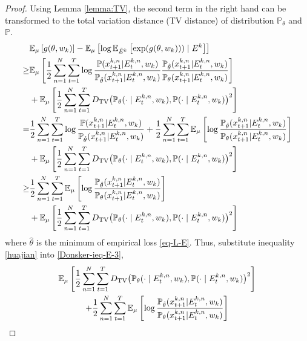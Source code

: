\begin{proof}
	Using Lemma \ref{lemma:TV}, the second term in the right hand can be transformed to the total variation distance (TV distance) of distribution $\mathbb{P}_\theta$ and $\mathbb{P}$.
	\begin{align}
		&\mathbb{E}_{\mu}\left[g(\theta,w_k)\right]-\mathbb{E}_{\mu}\left[\log \mathbb{E}_{\tilde{E}^k}\left[\exp(g(\theta,w_k)))\mid E^k\right]\right] \nonumber\\
		\geq&\mathbb{E}_{\mu}\left[\frac{1}{2}\sum_{n=1}^{N}\sum_{t=1}^T\operatorname{log}\frac{\mathbb{P}(x^{k,n}_{t+1}|E^{k,n}_t,w_k)}{\mathbb{P}_{\hat{\theta}}(x^{k,n}_{t+1}|E^{k,n}_t,w_k)}\frac{\mathbb{P}_{\hat{\theta}}(x^{k,n}_{t+1}|E^{k,n}_t,w_k)}{\mathbb{P}_\theta(x^{k,n}_{t+1}|E^{k,n}_t,w_k)}\right]\\
		&+\mathbb{E}_{\mu}\left[\frac{1}{2}\sum_{n=1}^{N}\sum_{t=1}^TD_{\mathrm{TV}}\big(\mathbb{P}_{\theta}(\cdot\mid E^{k,n}_t,w_k),\mathbb{P}(\cdot\mid E^{k,n}_t,w_k)\big)^2\right] \nonumber\\
		=&\frac{1}{2}\sum_{n=1}^{N}\sum_{t=1}^T\operatorname{log}\frac{\mathbb{P}(x^{k,n}_{t+1}|E^{k,n}_t,w_k)}{\mathbb{P}_{\hat{\theta}}(x^{k,n}_{t+1}|E^{k,n}_t,w_k)}+\frac{1}{2}\sum_{n=1}^{N}\sum_{t=1}^T\mathbb{E}_{\mu}\left[\operatorname{log}\frac{\mathbb{P}_{\hat{\theta}}(x^{k,n}_{t+1}|E^{k,n}_t,w_k)}{\mathbb{P}_\theta(x^{k,n}_{t+1}|E^{k,n}_t,w_k)}\right]\nonumber\\
		&+\mathbb{E}_{\mu}\left[\frac{1}{2}\sum_{n=1}^{N}\sum_{t=1}^TD_{\mathrm{TV}}\big(\mathbb{P}_{\theta}(\cdot\mid E^{k,n}_t,w_k),\mathbb{P}(\cdot\mid E^{k,n}_t,w_k)\big)^2\right] \nonumber\\
		\geq& \frac{1}{2}\sum_{n=1}^{N}\sum_{t=1}^T\mathbb{E}_{\mu}\left[\operatorname{log}\frac{\mathbb{P}_{\hat{\theta}}(x^{k,n}_{t+1}|E^{k,n}_t,w_k)}{\mathbb{P}_{{\theta}}(x^{k,n}_{t+1}|E^{k,n}_t,w_k)}\right]\nonumber\\
		&+\mathbb{E}_{\mu}\left[\frac{1}{2}\sum_{n=1}^{N}\sum_{t=1}^TD_{\mathrm{TV}}\big(\mathbb{P}_{\theta}(\cdot\mid E^{k,n}_t,w_k),\mathbb{P}(\cdot\mid E^{k,n}_t,w_k)\big)^2\right] \label{huajian}
	\end{align}
	where $\hat{\theta}$ is the minimum of empirical loss \ref{eq-L-E}. 
	Thus, substitute inequality \ref{huajian} into \ref{Donsker-ieq-E-3},  
	\begin{multline}
		\label{emperical-res-wk}
		\mathbb{E}_{\mu}\left[\frac{1}{2}\sum_{n=1}^{N}\sum_{t=1}^T\TV\big(\mathbb{P}_{\theta}(\cdot\mid E^{k,n}_t,w_k),\mathbb{P}(\cdot\mid E^{k,n}_t,w_k)\big)^2\right]
		\\+\frac{1}{2}\sum_{n=1}^{N}\sum_{t=1}^T\mathbb{E}_{\mu}\left[\operatorname{log}\frac{\mathbb{P}_{\hat{\theta}}(x^{k,n}_{t+1}|E^{k,n}_t,w_k)}{\mathbb{P}_{{\theta}}(x^{k,n}_{t+1}|E^{k,n}_t,w_k)}\right]

\end{multline}
\end{proof}
